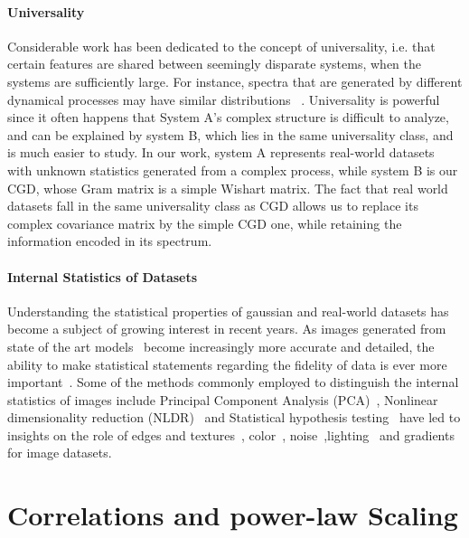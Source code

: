\documentclass{article}
\begin{document}
\paragraph{Universality}
Considerable work has been dedicated to the concept of universality, i.e. that certain features are shared between seemingly disparate systems, when the systems are sufficiently large. For instance, spectra that are generated by different dynamical processes may have similar distributions ~\citep{Bao_2015,baik2004phase,hu2022universality,bai2010spectral}. 
Universality is powerful since it often happens that System A's complex structure is difficult to analyze, and can be explained by system B, which lies in the same universality class, and is much easier to study. In our work, system A represents real-world datasets with unknown statistics generated from a complex process, while system B is our CGD, whose Gram matrix is a simple Wishart matrix. The fact that real world datasets fall in the same universality class as CGD allows us to replace its complex covariance matrix by the simple CGD one, while retaining the information encoded in its spectrum. 


\paragraph{Internal Statistics of Datasets}
Understanding the statistical properties of gaussian and real-world datasets has become a subject of growing interest in recent years. As images generated from state of the art models~\citep{midjourney,rombach2021highresolution,masood2021deepfakes} become increasingly more accurate and detailed, the ability to make statistical statements regarding the fidelity of data is ever more important~\citep{goodfellow2015explaining,carlini2017evaluating,rössler2019faceforensics, deepfakedetection2}.
Some of the methods commonly employed to distinguish the internal statistics of images include Principal Component Analysis (PCA)~\citep{pearson1901liii,PCA}, Nonlinear dimensionality reduction (NLDR)~\citep{kempfert2019comparison,Das_2022,AYESHA202044} and Statistical hypothesis testing~\citep{nuzzo2014statistical, hao2022deepfake} have led to insights on the role of edges and textures~\citep{5583264}, color~\citep{8355817}, noise~\citep{yue2020variational},lighting~\citep{Dror2004StatisticalCO} and gradients~\citep{5995401} for image datasets.



\section{Correlations and power-law Scaling}
\end{document}
